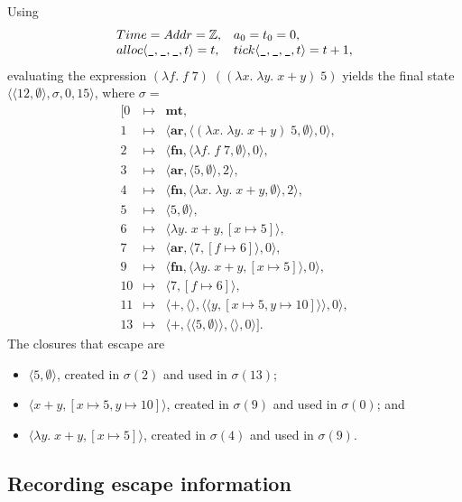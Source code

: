 \RequirePackage[hyphens]{url}\documentclass[12pt,oneside]{amsart}
\newcommand{\kw}[1]{\mathbf{#1}}
\newcommand{\lmd}[2]{\lambda #1.\;#2}
\begin{document}
Using
\[\begin{array}{ll}
Time = Addr = \mathbb{Z}, & a_0 = t_0 = 0, \\
alloc\langle\verb|_|, \verb|_|, \verb|_|, t\rangle = t, & tick\langle\verb|_|, \verb|_|, \verb|_|, t\rangle = t + 1,
\end{array}\]
evaluating the expression $(\lmd{f}{f\;7})\;((\lmd{x}{\lmd{y}{x+y}}) \; 5)$ yields the final state $\langle \langle 12, \emptyset\rangle, \sigma, 0, 15\rangle$, where $\sigma =$
\[\begin{array}{rll}
[0 & \mapsto & \kw{mt}, \\
1 & \mapsto & \langle\kw{ar}, \langle (\lmd{x}{\lmd{y}{x + y}}) \; 5,
    \emptyset\rangle, 0\rangle, \\
2 & \mapsto & \langle\kw{fn}, \langle\lmd{f}{f\;7}, \emptyset\rangle, 0\rangle, \\
3 & \mapsto & \langle\kw{ar}, \langle 5, \emptyset\rangle, 2\rangle, \\
4 & \mapsto & \langle\kw{fn}, \langle\lmd{x}\lmd{y}{x+y}, \emptyset\rangle, 2\rangle, \\
5 & \mapsto & \langle 5, \emptyset\rangle, \\
6 & \mapsto & \langle\lmd{y}{x+y}, [x\mapsto 5]\rangle, \\
7 & \mapsto & \langle\kw{ar}, \langle 7, [f\mapsto 6]\rangle, 0\rangle, \\
9 & \mapsto & \langle\kw{fn}, \langle\lmd{y}{x+y}, [x\mapsto 5]\rangle, 0\rangle, \\
10 & \mapsto & \langle 7, [f\mapsto 6]\rangle, \\
11 & \mapsto & \langle\kw{+}, \langle\rangle, \langle\langle y, [x\mapsto 5,
    y\mapsto 10]\rangle\rangle, 0\rangle, \\
13 & \mapsto & \langle\kw{+}, \langle\langle 5, \emptyset\rangle\rangle, \langle\rangle, 0\rangle].
\end{array}\]
The closures that escape are
\begin{itemize}
    \item $\langle 5, \emptyset\rangle$, created in $\sigma(2)$ and used in
        $\sigma(13)$;
    \item $\langle x + y, [x\mapsto 5, y\mapsto 10]\rangle$, created in $\sigma(9)$ and
        used in $\sigma(0)$; and
    \item $\langle\lmd{y}{x+y}, [x\mapsto 5]\rangle$, created in $\sigma(4)$ and used in $\sigma(9)$.
\end{itemize}

\subsection{Recording escape information}
\end{document}
